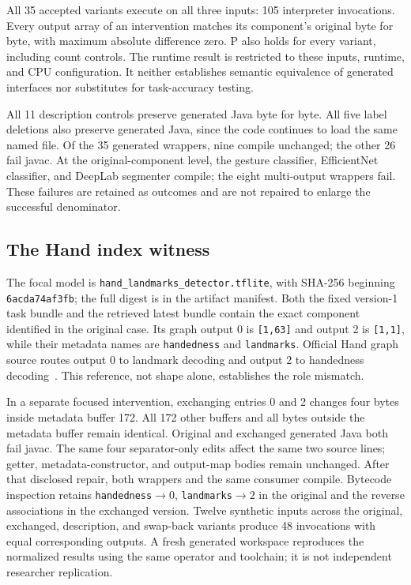 \documentclass[10pt,twocolumn,letterpaper]{article}
\newcommand{\code}[1]{\texttt{#1}}
\begin{document}
All 35 accepted variants execute on all three inputs: 105 interpreter invocations. Every output array of an intervention matches its component's original byte for byte, with maximum absolute difference zero. P also holds for every variant, including count controls. The runtime result is restricted to these inputs, runtime, and CPU configuration. It neither establishes semantic equivalence of generated interfaces nor substitutes for task-accuracy testing.

All 11 description controls preserve generated Java byte for byte. All five label deletions also preserve generated Java, since the code continues to load the same named file. Of the 35 generated wrappers, nine compile unchanged; the other 26 fail javac. At the original-component level, the gesture classifier, EfficientNet classifier, and DeepLab segmenter compile; the eight multi-output wrappers fail. These failures are retained as outcomes and are not repaired to enlarge the successful denominator.

\subsection{The Hand index witness}
The focal model is \code{hand\_landmarks\_detector.tflite}, with SHA-256 beginning \code{6acda74af3fb}; the full digest is in the artifact manifest. Both the fixed version-1 task bundle and the retrieved latest bundle contain the exact component identified in the original case. Its graph output 0 is \code{[1,63]} and output 2 is \code{[1,1]}, while their metadata names are \code{handedness} and \code{landmarks}. Official Hand graph source routes output 0 to landmark decoding and output 2 to handedness decoding~\cite{hand-graph}. This reference, not shape alone, establishes the role mismatch.

In a separate focused intervention, exchanging entries 0 and 2 changes four bytes inside metadata buffer 172. All 172 other buffers and all bytes outside the metadata buffer remain identical. Original and exchanged generated Java both fail javac. The same four separator-only edits affect the same two source lines; getter, metadata-constructor, and output-map bodies remain unchanged. After that disclosed repair, both wrappers and the same consumer compile. Bytecode inspection retains \code{handedness}$\to0$, \code{landmarks}$\to2$ in the original and the reverse associations in the exchanged version. Twelve synthetic inputs across the original, exchanged, description, and swap-back variants produce 48 invocations with equal corresponding outputs. A fresh generated workspace reproduces the normalized results using the same operator and toolchain; it is not independent researcher replication.
\end{document}
